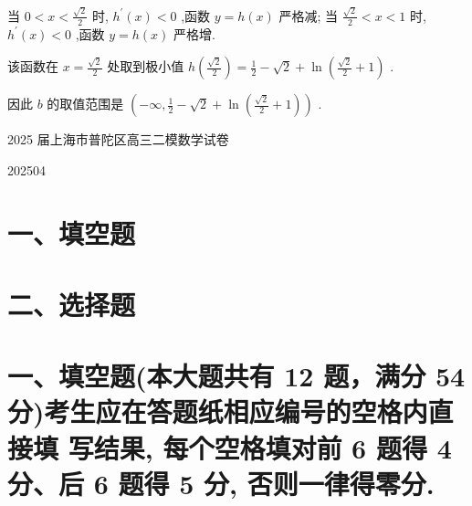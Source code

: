 \documentclass[10pt]{article}
\begin{document}
当 \(0 < x < \frac{\sqrt{2}}{2}\) 时, \({h}^{\prime }\left( x\right)  < 0\) ,函数 \(y = h\left( x\right)\) 严格减; 当 \(\frac{\sqrt{2}}{2} < x < 1\) 时, \({h}^{\prime }\left( x\right)  < 0\) ,函数 \(y = h\left( x\right)\) 严格增.

该函数在 \(x = \frac{\sqrt{2}}{2}\) 处取到极小值 \(h\left( \frac{\sqrt{2}}{2}\right)  = \frac{1}{2} - \sqrt{2} + \ln \left( {\frac{\sqrt{2}}{2} + 1}\right)\) .

因此 \(b\) 的取值范围是 \(\left( {-\infty ,\frac{1}{2} - \sqrt{2} + \ln \left( {\frac{\sqrt{2}}{2} + 1}\right) }\right)\) .

2025 届上海市普陀区高三二模数学试卷

202504

\section*{一、填空题}

\begin{center}
\end{center}

\section*{二、选择题}

\begin{center}
\end{center}

\section*{一、填空题(本大题共有 12 题，满分 54 分)考生应在答题纸相应编号的空格内直接填 写结果, 每个空格填对前 6 题得 4 分、后 6 题得 5 分, 否则一律得零分.}
\end{document}
